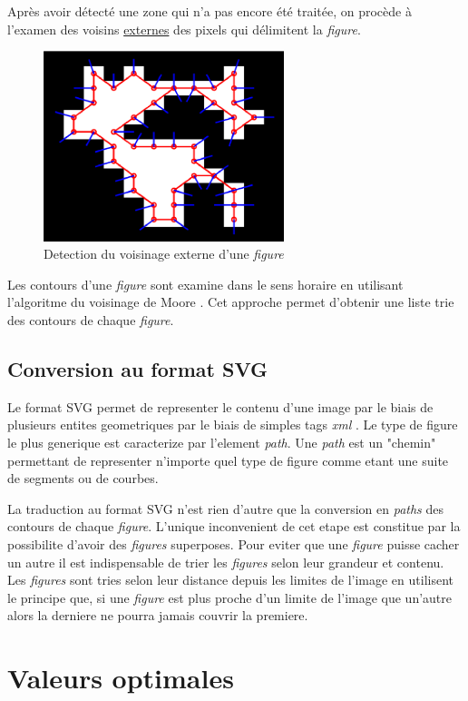 \documentclass[twoside,openright,a4paper,11pt,french]{article}
\begin{document}
Après avoir détecté une zone qui n'a pas encore été traitée, on procède
à l'examen des voisins \underline{externes} des pixels qui délimitent
la {\it figure}.

\begin{figure}[h]
\centering
\includegraphics[width=7cm]{./pics/moore.eps}
\caption{Detection du voisinage externe d'une {\it figure}}
\label{fig:moore}
\end{figure}

Les contours d'une {\it figure} sont examine dans le sens horaire en
utilisant l'algoritme du voisinage de Moore \cite{url-moore}. Cet
approche permet d'obtenir une liste trie des contours de chaque {\it
figure}.


\subsection{Conversion au format SVG}
Le format SVG permet de representer le contenu d'une image par le
biais de plusieurs entites geometriques par le biais de simples tags
{\it xml} \cite{url-svg}. Le type de figure le plus generique est
caracterize par l'element {\it path}. Une {\it path} est un "chemin"
permettant  de representer n'importe quel type de figure comme etant
une suite de segments ou de courbes.

La traduction au format SVG n'est rien d'autre que la conversion en
{\it paths} des contours de chaque {\it figure}. L'unique inconvenient
de cet etape est constitue par la possibilite d'avoir des {\it
figures} superposes.  Pour eviter que une {\it figure} puisse cacher
un autre il est indispensable de trier les {\it figures} selon leur
grandeur et contenu. Les {\it figures} sont tries selon leur distance 
depuis les limites de l'image en utilisent le principe que, si une
{\it figure } est plus proche d'un limite de l'image que un'autre
alors la derniere ne pourra jamais couvrir la premiere.


\section{Valeurs optimales}



\newpage
{}


\end{document}
